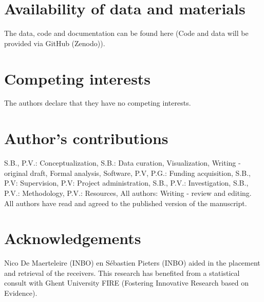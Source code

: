 \documentclass[doublespacing,linenumbers]{bmcart}
\begin{document}

\begin{backmatter}

\section*{Availability of data and materials}
The data, code and documentation can be found here (Code and data will be provided via GitHub (Zenodo)). 

\section*{Competing interests}
The authors declare that they have no competing interests.

\section*{Author's contributions}
S.B., P.V.: Conceptualization, S.B.: Data curation, Visualization, Writing - original draft, Formal analysis, Software, P.V, P.G.: Funding acquisition, S.B., P.V: Supervision, P.V: Project administration, S.B., P.V.: Investigation, S.B., P.V.: Methodology, P.V.: Resources, All authors: Writing - review and editing. All authors have read and agreed to the published version of the manuscript.

\section*{Acknowledgements}
Nico De Maerteleire (INBO) en Sébastien Pieters (INBO) aided in the placement and retrieval of the receivers. This research has benefited from a statistical consult with Ghent University FIRE (Fostering Innovative Research based on Evidence).


\end{backmatter}
\end{document}
